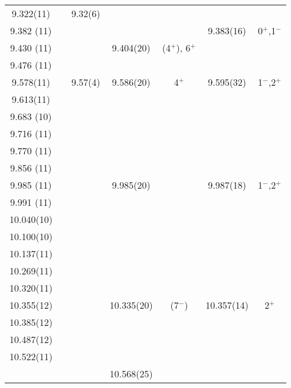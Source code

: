 \begin{center}
\begin{longtable}{cc c cc cc}
   9.322(11)    &       &     9.32(6)       &       &       &       &       \\
  9.382 (11)    &       &       &       &       &    9.383(16)      &          0$^+$,1$^-$      \\
  9.430 (11)    &       &                   &     9.404(20)     &         (4$^+$), 6$^+$    &                   &                           \\
  9.476 (11)    &       &       &       &       &       &       \\
   9.578(11)    &       &     9.57(4)       &    9.586(20)      &           4$^+$           &   9.595(32)       &         1$^-$,2$^+$       \\
   9.613(11)    &       &       &       &       &       &       \\
  9.683 (10)    &       &       &       &       &       &       \\
  9.716 (11)    &       &       &       &       &       &       \\
  9.770 (11)    &       &       &       &       &       &       \\
  9.856 (11)    &       &       &       &       &       &       \\
  9.985 (11)    &       &       &     9.985(20)     &                           &    9.987(18)      &         1$^-$,2$^+$       \\
  9.991 (11)    &       &       &       &       &       &       \\
  10.040(10)    &       &       &       &       &       &       \\
  10.100(10)    &       &       &       &       &       &       \\
  10.137(11)    &       &       &       &       &       &       \\
  10.269(11)    &       &       &       &       &       &       \\
  10.320(11)    &       &       &       &       &       &       \\
  10.355(12)    &       &                   &     10.335(20)    &           (7$^-$)         &   10.357(14)      &         2$^+$             \\
  10.385(12)    &       &       &       &       &       &       \\
  10.487(12)    &       &       &       &       &       &       \\
  10.522(11)    &       &       &       &       &       &       \\
    &       &                   &    10.568(25)     &                           &                   &                           \\

\end{longtable}
\end{center}

